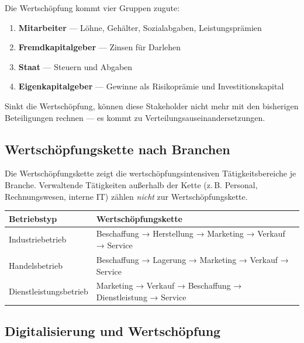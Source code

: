 \documentclass[11pt, a4paper]{article}
\begin{document}
\begin{merksatz}[title={\bfseries Merke: Wertschöpfungsnutznießer}]
Die Wertschöpfung kommt vier Gruppen zugute:
\begin{enumerate}
  \item \textbf{Mitarbeiter} --- Löhne, Gehälter, Sozialabgaben, Leistungsprämien
  \item \textbf{Fremdkapitalgeber} --- Zinsen für Darlehen
  \item \textbf{Staat} --- Steuern und Abgaben
  \item \textbf{Eigenkapitalgeber} --- Gewinne als Risikoprämie und Investitionskapital
\end{enumerate}
Sinkt die Wertschöpfung, können diese Stakeholder nicht mehr mit den bisherigen Beteiligungen
rechnen --- es kommt zu Verteilungsauseinandersetzungen.
\end{merksatz}

\subsection{Wertschöpfungskette nach Branchen}

Die Wertschöpfungskette zeigt die wertschöpfungsintensiven Tätigkeitsbereiche je Branche.
Verwaltende Tätigkeiten außerhalb der Kette (z.\,B. Personal, Rechnungswesen, interne IT)
zählen \emph{nicht} zur Wertschöpfungskette.

\begin{center}
\begin{tabular}{p{3.5cm} p{9.5cm}}
\toprule
\textbf{Betriebstyp} & \textbf{Wertschöpfungskette}\\
\midrule
Industriebetrieb & Beschaffung → Herstellung → Marketing → Verkauf → Service\\
\addlinespace
Handelsbetrieb & Beschaffung → Lagerung → Marketing → Verkauf → Service\\
\addlinespace
Dienstleistungs\-betrieb & Marketing → Verkauf → Beschaffung → Dienstleistung → Service\\
\bottomrule
\end{tabular}
\end{center}

\subsection{Digitalisierung und Wertschöpfung}
\end{document}
